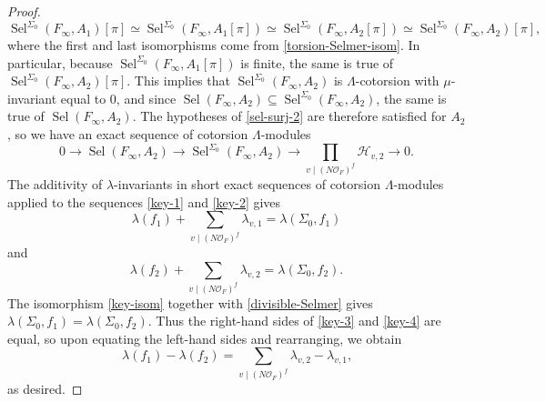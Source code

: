 \documentclass[12 pt]{amsart}
\theoremstyle{plain}
\theoremstyle{definition}
\numberwithin{equation}{section}
\numberwithin{table}{section}
\begin{document}
\begin{proof}
\begin{equation}
\label{key-isom}
\operatorname{Sel}^{\Sigma_0}(F_\infty,A_1)[\pi]\simeq\operatorname{Sel}^{\Sigma_0}(F_\infty,A_1[\pi])
\simeq\operatorname{Sel}^{\Sigma_0}(F_\infty,A_2[\pi])\simeq\operatorname{Sel}^{\Sigma_0}(F_\infty,A_2)[\pi]\text{,}
\end{equation}
where the first and last isomorphisms come from \cref{torsion-Selmer-isom}. In particular, because $\operatorname{Sel}^{\Sigma_0}(F_\infty,A_1[\pi])$ is finite, the same is true of $\operatorname{Sel}^{\Sigma_0}(F_\infty,A_2)[\pi]$. This implies that $\operatorname{Sel}^{\Sigma_0}(F_\infty,A_2)$ is $\Lambda$-cotorsion with $\mu$-invariant equal to $0$, and since $\operatorname{Sel}(F_\infty,A_2)\subseteq\operatorname{Sel}^{\Sigma_0}(F_\infty,A_2)$, the same is true of $\operatorname{Sel}(F_\infty,A_2)$. The hypotheses of \cref{sel-surj-2} are therefore satisfied for $A_2$, so we have an exact sequence of cotorsion $\Lambda$-modules
\begin{equation}
\label{key-2}
0\rightarrow\operatorname{Sel}(F_\infty,A_2)\rightarrow\operatorname{Sel}^{\Sigma_0}(F_\infty,A_2)\rightarrow\prod_{v\mid(N\mathscr{O}_F)^f}\mathcal{H}_{v,2}\rightarrow 0\text{.}
\end{equation}
The additivity of $\lambda$-invariants in short exact sequences of cotorsion $\Lambda$-modules applied to the sequences \cref{key-1} and \cref{key-2} gives
\begin{equation}
\label{key-3}
\lambda(f_1)+\sum_{v\mid(N\mathscr{O}_F)^f}\lambda_{v,1}=\lambda(\Sigma_0,f_1)
\end{equation}
and
\begin{equation}
\label{key-4}
\lambda(f_2)+\sum_{v\mid(N\mathscr{O}_F)^f}\lambda_{v,2}=\lambda(\Sigma_0,f_2)\text{.}
\end{equation}
The isomorphism \cref{key-isom} together with \cref{divisible-Selmer} gives $\lambda(\Sigma_0,f_1)=\lambda(\Sigma_0,f_2)$. Thus the right-hand sides of \cref{key-3} and \cref{key-4} are equal, so upon equating the left-hand sides and rearranging, we obtain
\begin{equation*}
\lambda(f_1)-\lambda(f_2)=\sum_{v\mid(N\mathscr{O}_F)^f}\lambda_{v,2}-\lambda_{v,1}\text{,}
\end{equation*}
as desired. 
\end{proof}
\end{document}
